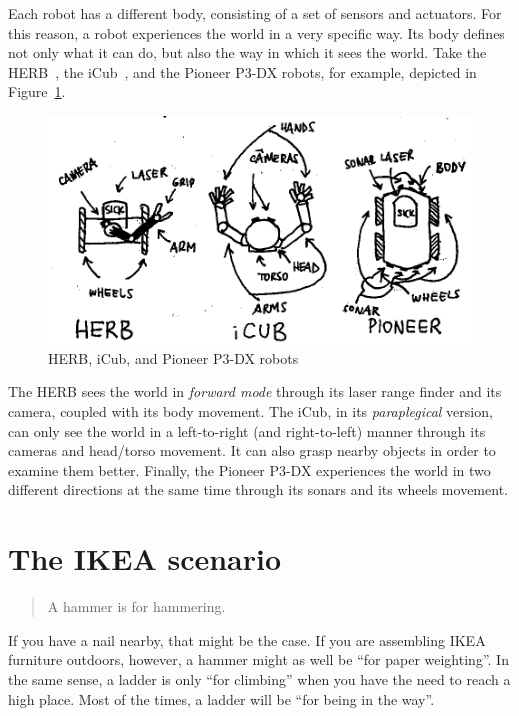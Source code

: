 \documentclass{article}
\begin{document}
Each robot has a different body, consisting of a set of sensors and actuators. 
For this reason, a robot experiences the world in a very specific way. Its body
defines not only what it can do, but also the way in which it sees the world.
Take the HERB~\cite{srinivasa2009herb}, the iCub~\cite{metta2010icub}, and the
Pioneer P3-DX robots, for example, depicted in
Figure~\ref{fig:herb_icub_pioneer}.

\begin{figure}[h]
  \centering
  \includegraphics{figures/herb_icub_pioneer.png}
  \caption{HERB, iCub, and Pioneer P3-DX robots}
  \label{fig:herb_icub_pioneer}
\end{figure}

The HERB sees the world in \emph{forward mode} through its laser range finder
and its camera, coupled with its body movement. The iCub, in its
\emph{paraplegical} version, can only see the world in a left-to-right (and
right-to-left) manner through its cameras and head/torso movement. It can also
grasp nearby objects in order to examine them better. Finally, the Pioneer P3-DX
experiences the world in two different directions at the same time through its
sonars and its wheels movement. 


\section{The IKEA scenario}

\begin{quotation}
  A hammer is for hammering.
\end{quotation}

If you have a nail nearby, that might be the case. If you are assembling IKEA
furniture outdoors, however, a hammer might as well be ``for paper weighting''.
In the same sense, a ladder is only ``for climbing'' when you have the need to
reach a high place. Most of the times, a ladder will be
``for being in the way''.
\end{document}
